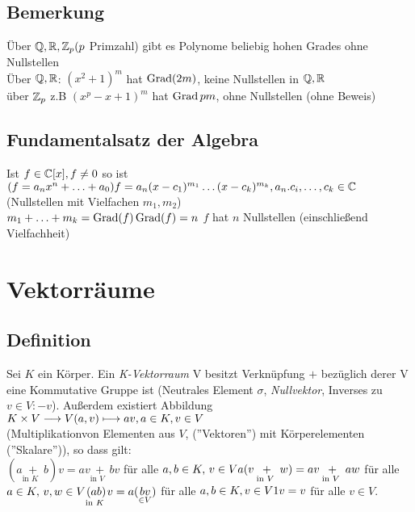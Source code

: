 \subsection{Bemerkung}
Über $\mathbb{Q},\mathbb{R},\mathbb{Z}_p (p$ Primzahl) gibt es Polynome beliebig hohen Grades ohne Nullstellen\\
Über $\mathbb{Q},\mathbb{R}$: $(x^2 +1)^m$ hat $\operatorname{Grad}(2m)$, keine Nullstellen in $\mathbb{Q},\mathbb{R}$\\
über $\mathbb{Z}_p$ z.B $(x^p - x +1)^m$ hat $\operatorname{Grad} pm$, ohne Nullstellen (ohne Beweis)
\subsection{Fundamentalsatz der Algebra}
Ist $ f \in \mathbb{C}[x], f \ne  0$ so ist $(f=a_nx^n+\ldots+a_0)\\
f = a_n (x-c_1)^{m_1} \ldots (x-c_k)^{m_k}, a_n.c_i,\ldots,c_k \in \mathbb{C}$ (Nullstellen mit Vielfachen $m_1,m_2$)\\
$m_1 + \ldots + m_k = \operatorname{Grad}(f)\\
\operatorname{Grad}(f) = n$ $f$ hat $n$ Nullstellen (einschlie\ss end Vielfachheit)
\section{Vektorräume}
\subsection{Definition}\label{sec:2.1}
Sei $K$ ein Körper. Ein \emph{K-Vektorraum}  V besitzt Verknüpfung $+$ bezüglich derer V eine Kommutative Gruppe ist (Neutrales Element $\sigma$, \emph{Nullvektor}, Inverses zu $v \in V : -v$). Au\ss erdem existiert Abbildung $K \times V \longrightarrow V\\
(a,v)\longmapsto av, a \in K, v \in V$\\
(\glqq Multiplikation\grqq von Elementen aus $V$, (''Vektoren'') mit Körperelementen (''Skalare'')), so dass gilt:\\ $(a \underset{\text{in $K$ }}{+} b)v = av \underset{\text{in $V$ }}{+} bv$ für alle $a,b \in K,\, v \in V\\
a(v\underset{\text{in $V$ }}{+}w) = av \underset{\text{in $V$ }}{+} aw$ für alle $a \in K,\, v,w \in V\\
\underset{\text{in $K$ }}{(ab)}v = a(\underset{\in V}{bv})$ für alle $a,b\in K, v \in V\\
1v = v$ für alle $v \in V$.

